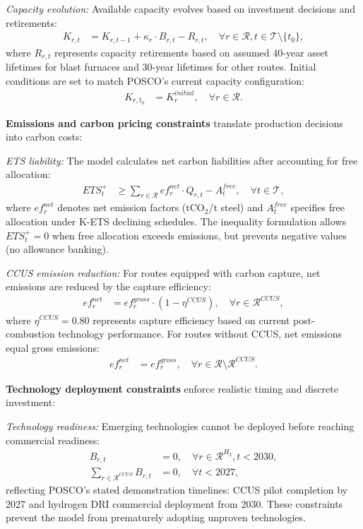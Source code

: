 \textit{Capacity evolution:} Available capacity evolves based on investment decisions and retirements:
\begin{align}
K_{r,t} &= K_{r,t-1} + \kappa_r \cdot B_{r,t} - R_{r,t}, \quad \forall r \in \mathcal{R}, t \in \mathcal{T} \setminus \{t_0\}, \label{eq:capacity}
\end{align}
where $R_{r,t}$ represents capacity retirements based on assumed 40-year asset lifetimes for blast furnaces and 30-year lifetimes for other routes. Initial conditions are set to match POSCO's current capacity configuration:
\begin{align}
K_{r,t_0} &= K_r^{initial}, \quad \forall r \in \mathcal{R}. \label{eq:initial}
\end{align}

\textbf{Emissions and carbon pricing constraints} translate production decisions into carbon costs:

\textit{ETS liability:} The model calculates net carbon liabilities after accounting for free allocation:
\begin{align}
ETS_t^+ &\ge \sum_{r \in \mathcal{R}} ef_r^{net} \cdot Q_{r,t} - A_t^{free}, \quad \forall t \in \mathcal{T}, \label{eq:ets_balance}
\end{align}
where $ef_r^{net}$ denotes net emission factors (tCO$_2$/t steel) and $A_t^{free}$ specifies free allocation under K-ETS declining schedules. The inequality formulation allows $ETS_t^+ = 0$ when free allocation exceeds emissions, but prevents negative values (no allowance banking).

\textit{CCUS emission reduction:} For routes equipped with carbon capture, net emissions are reduced by the capture efficiency:
\begin{align}
ef_r^{net} &= ef_r^{gross} \cdot (1 - \eta^{CCUS}), \quad \forall r \in \mathcal{R}^{CCUS}, \label{eq:ccus_factor}
\end{align}
where $\eta^{CCUS} = 0.80$ represents capture efficiency based on current post-combustion technology performance. For routes without CCUS, net emissions equal gross emissions:
\begin{align}
ef_r^{net} &= ef_r^{gross}, \quad \forall r \in \mathcal{R} \setminus \mathcal{R}^{CCUS}. \label{eq:no_ccus}
\end{align}

\textbf{Technology deployment constraints} enforce realistic timing and discrete investment:

\textit{Technology readiness:} Emerging technologies cannot be deployed before reaching commercial readiness:
\begin{align}
B_{r,t} &= 0, \quad \forall r \in \mathcal{R}^{H_2}, t < 2030, \label{eq:h2_timing}\\
\sum_{r \in \mathcal{R}^{CCUS}} B_{r,t} &= 0, \quad \forall t < 2027, \label{eq:ccus_timing}
\end{align}
reflecting POSCO's stated demonstration timelines: CCUS pilot completion by 2027 and hydrogen DRI commercial deployment from 2030. These constraints prevent the model from prematurely adopting unproven technologies.


